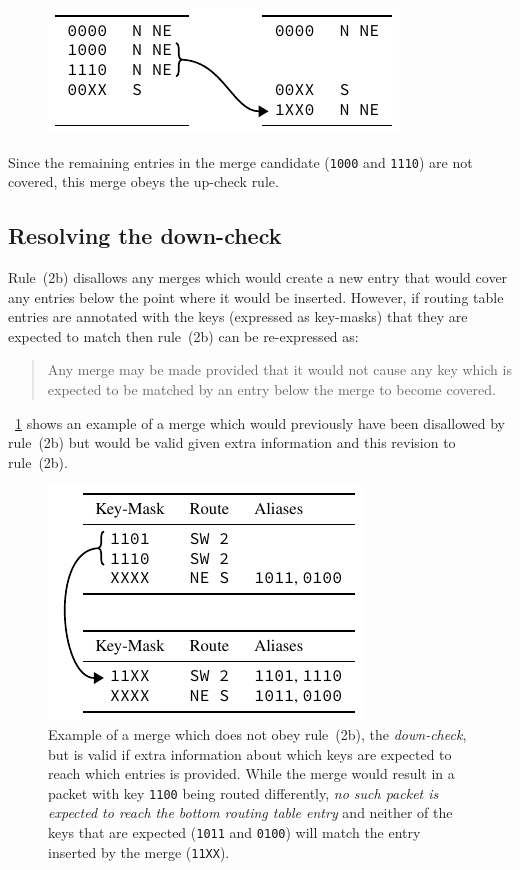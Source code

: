 \documentclass[conference]{IEEEtran}
\newcommand{\mytt}[1]{\texttt{\footnotesize#1}}
\begin{document}
  \begin{figure}[H]
    \centering
    \includegraphics{figures/upcheck_resolve_example_2}
  \end{figure}

  \noindent Since the remaining entries in the merge candidate (\mytt{1000} and \mytt{1110}) are not covered, this merge obeys the up-check rule.

  \subsection{Resolving the down-check}
  
  Rule~(2b) disallows any merges which would create a new entry that would cover any entries below the point where it would be inserted.
  However, if routing table entries are annotated with the keys (expressed as key-masks) that they are expected to match then rule~(2b) can be re-expressed as:

  \begin{quote}
    Any merge may be made provided that it would not cause any key which is expected to be matched by an entry below the merge to become covered.
  \end{quote}

  \figurename~\ref{fig:algorithm/rule2b'_example} shows an example of a merge which would previously have been disallowed by rule~(2b) but would be valid given extra information and this revision to rule~(2b).

  \begin{figure}
    \centering
    \includegraphics{figures/aliases_example}
    \caption{
      Example of a merge which does not obey rule~(2b), the \textit{down-check}, but is valid if extra information about which keys are expected to reach which entries is provided.
      While the merge would result in a packet with key \mytt{1100} being routed differently, \textit{no such packet is expected to reach the bottom routing table entry} and neither of the keys that are expected (\mytt{1011} and \mytt{0100}) will match the entry inserted by the merge (\mytt{11XX}).
    }
    \label{fig:algorithm/rule2b'_example}
  \end{figure}
\end{document}
